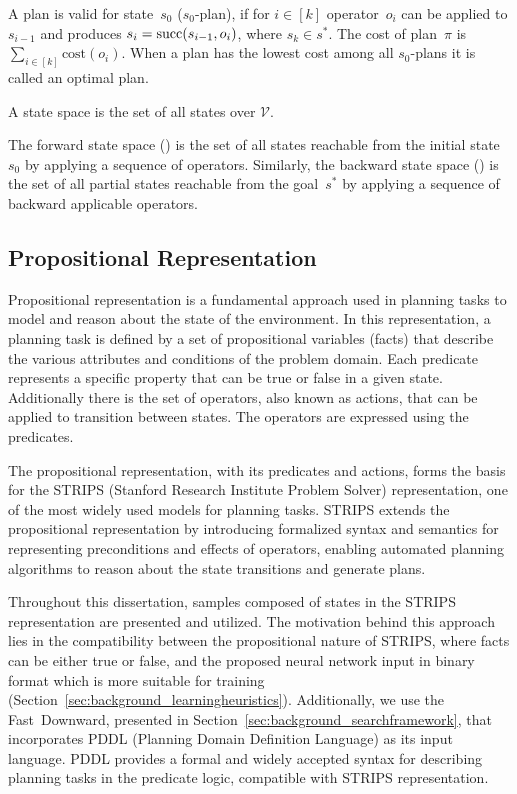 A plan is valid for state~$s_0$ ($s_0$-plan), if for $i\in[k]$ operator~$o_i$ can be applied to $s_{i-1}$ and produces $s_i=\operatorname{succ}(s_{i-1},o_i)$, where $s_k \in s^*$. The cost of plan~$\pi$ is $\sum_{i\in[k]} \text{cost}(o_i)$. When a plan has the lowest cost among all $s_0$-plans it is called an optimal plan.

\begin{definition}\label{def:statespace}
    A state space is the set of all states over $\mathcal{V}$.
\end{definition}

The forward state space (\fssp) is the set of all states reachable from the initial state~$s_0$ by applying a sequence of operators. Similarly, the backward state space (\bssp) is the set of all partial states reachable from the goal~$s^*$ by applying a sequence of backward applicable operators.

\subsection{Propositional Representation}
\label{sec:background_strips}

Propositional representation is a fundamental approach used in planning tasks to model and reason about the state of the environment. In this representation, a planning task is defined by a set of propositional variables (facts) that describe the various attributes and conditions of the problem domain. Each predicate represents a specific property that can be true or false in a given state. Additionally there is the set of operators, also known as actions, that can be applied to transition between states. The operators are expressed using the predicates. 

The propositional representation, with its predicates and actions, forms the basis for the STRIPS (Stanford Research Institute Problem Solver) representation, one of the most widely used models for planning tasks. STRIPS extends the propositional representation by introducing formalized syntax and semantics for representing preconditions and effects of operators, enabling automated planning algorithms to reason about the state transitions and generate plans.

Throughout this dissertation, samples composed of states in the STRIPS representation are presented and utilized. The motivation behind this approach lies in the compatibility between the propositional nature of STRIPS, where facts can be either true or false, and the proposed neural network input in binary format which is more suitable for training (Section~\ref{sec:background_learningheuristics}). Additionally, we use the Fast~Downward, presented in Section~\ref{sec:background_searchframework}, that incorporates PDDL (Planning Domain Definition Language) as its input language. PDDL provides a formal and widely accepted syntax for describing planning tasks in the predicate logic, compatible with STRIPS representation.

